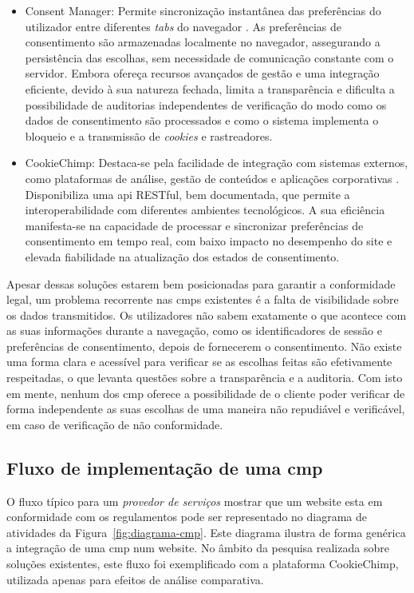 \begin{itemize}
    \item Consent Manager: Permite sincronização instantânea das preferências do utilizador entre diferentes \textit{tabs} do navegador \cite{ConsentManager2024}. As preferências de consentimento são armazenadas localmente no navegador, assegurando a persistência das escolhas, sem necessidade de comunicação constante com o servidor. Embora ofereça recursos avançados de gestão e uma integração eficiente, devido à sua natureza fechada, limita a transparência e dificulta a possibilidade de auditorias independentes de verificação do modo como os dados de consentimento são processados e como o sistema implementa o bloqueio e a transmissão de \textit{cookies} e rastreadores.

    \item CookieChimp: Destaca-se pela facilidade de integração com sistemas externos, como plataformas de análise, gestão de conteúdos e aplicações corporativas \cite{CookieChimp2024}. Disponibiliza uma \acrshort{api} RESTful, bem documentada, que permite a interoperabilidade com diferentes ambientes tecnológicos. A sua eficiência manifesta-se na capacidade de processar e sincronizar preferências de consentimento em tempo real, com baixo impacto no desempenho do site e elevada fiabilidade na atualização dos estados de consentimento.
\end{itemize}

Apesar dessas soluções estarem bem posicionadas para garantir a conformidade legal, um problema recorrente nas \acrshort{cmp}s existentes é a falta de visibilidade sobre os dados transmitidos. Os utilizadores não sabem exatamente o que acontece com as suas informações durante a navegação, como os identificadores de sessão e preferências de consentimento, depois de fornecerem o consentimento. Não existe uma forma clara e acessível para verificar se as escolhas feitas são efetivamente respeitadas, o que levanta questões sobre a transparência e a auditoria. Com isto em mente, nenhum dos \acrshort{cmp} oferece a possibilidade de o cliente poder verificar de forma independente as suas escolhas de uma maneira não repudiável e verificável, em caso de verificação de não conformidade.

\subsection{Fluxo de implementação de uma \acrshort{cmp}}

O fluxo típico para um \textit{provedor de serviços} mostrar que um website esta em conformidade com os regulamentos pode ser representado no diagrama de atividades da Figura~\ref{fig:diagrama-cmp}.
Este diagrama ilustra de forma genérica a integração de uma \acrshort{cmp} num website.
No âmbito da pesquisa realizada sobre soluções existentes, este fluxo foi exemplificado com a plataforma CookieChimp, utilizada apenas para efeitos de análise comparativa.

